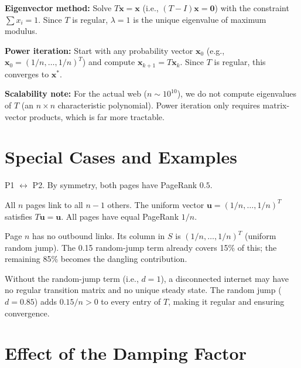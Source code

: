 \textbf{Eigenvector method:} Solve $T\mathbf{x}=\mathbf{x}$ (i.e., $(T-I)\mathbf{x}=\mathbf{0}$) with the constraint $\sum x_i=1$. Since $T$ is regular, $\lambda=1$ is the unique eigenvalue of maximum modulus.

\textbf{Power iteration:} Start with any probability vector $\mathbf{x}_0$ (e.g., $\mathbf{x}_0=(1/n,\ldots,1/n)^T$) and compute $\mathbf{x}_{k+1}=T\mathbf{x}_k$. Since $T$ is regular, this converges to $\mathbf{x}^*$.

\textbf{Scalability note:} For the actual web ($n\sim10^{10}$), we do not compute eigenvalues of $T$ (an $n\times n$ characteristic polynomial). Power iteration only requires matrix-vector products, which is far more tractable.

\section{Special Cases and Examples}

\begin{example}
P1 $\leftrightarrow$ P2. By symmetry, both pages have PageRank $0.5$.
\end{example}

\begin{example}
All $n$ pages link to all $n-1$ others. The uniform vector $\mathbf{u}=(1/n,\ldots,1/n)^T$ satisfies $T\mathbf{u}=\mathbf{u}$. All pages have equal PageRank $1/n$.
\end{example}

\begin{example}
Page $n$ has no outbound links. Its column in $S$ is $(1/n,\ldots,1/n)^T$ (uniform random jump). The 0.15 random-jump term already covers 15\% of this; the remaining 85\% becomes the dangling contribution.
\end{example}

\begin{example}
Without the random-jump term (i.e., $d=1$), a disconnected internet may have no regular transition matrix and no unique steady state. The random jump ($d=0.85$) adds $0.15/n>0$ to every entry of $T$, making it regular and ensuring convergence.
\end{example}

\section{Effect of the Damping Factor}

